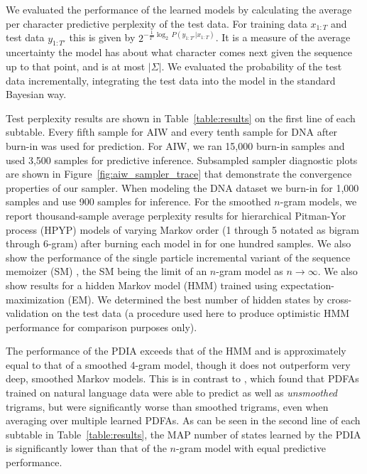 We evaluated the performance of the learned models by calculating the average per character predictive perplexity of the test data.  For training data $x_{1:T}$ and test data $y_{1:T'}$ this is given by $2^{-\frac{1}{T'}\log_2\, P(y_{1:T'}|x_{1:T})}$.  It is a measure of the average uncertainty the model has about what character comes next given the sequence up to that point, and is at most $|\Sigma|$.  We evaluated the probability of the test data incrementally, integrating the test data into the model in the standard Bayesian way.  



Test perplexity results are shown in Table~\ref{table:results} on the first line of each subtable.  Every fifth sample for AIW and every tenth sample for DNA after burn-in was used for prediction.  For AIW, we ran 15,000 burn-in samples and used 3,500 samples for predictive inference.  Subsampled sampler diagnostic plots are shown in Figure~\ref{fig:aiw_sampler_trace} that demonstrate the convergence properties of our sampler.  When modeling the DNA dataset we burn-in for 1,000 samples and use 900 samples for inference.
For the smoothed $n$-gram models, we report thousand-sample average perplexity results for hierarchical Pitman-Yor process (HPYP) \cite{Teh2006a} models of varying Markov order (1 through 5 notated as bigram through 6-gram) after burning each model in for one hundred samples.  We also show the performance of the single particle incremental variant of the sequence memoizer (SM) \cite{Gasthaus2010}, the SM being the limit of an $n$-gram model as $n\rightarrow\infty$.
We also show results for a hidden Markov model (HMM) \cite{Murphy2005} trained using expectation-maximization (EM).  We determined the best number of hidden states by cross-validation on the test data (a procedure used here to produce optimistic HMM performance for comparison purposes only).  


The performance of the PDIA exceeds that of the HMM and is approximately equal to that of a smoothed 4-gram model, though it does not outperform very deep, smoothed Markov models.  This is in contrast to \cite{Thollard2001}, which found that PDFAs trained on natural language data were able to predict as well as {\em unsmoothed} trigrams, but were significantly worse than smoothed trigrams, even when averaging over multiple learned PDFAs.  As can be seen in the second line of each subtable in Table~\ref{table:results}, the MAP number of states learned by the PDIA is significantly lower than that of the $n$-gram model with equal predictive performance.


